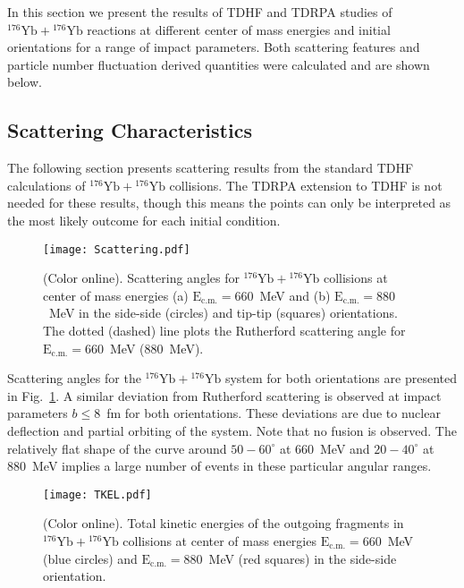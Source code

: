 \documentclass[reprint,aps,prc,twocolumn,superscriptaddress,floatfix,10pt]{revtex4-2}
\begin{document}
In this section we present the results of TDHF and TDRPA studies of $^{176}\mathrm{Yb}+{}^{176}\mathrm{Yb}$ reactions at different center of mass energies and initial orientations  for a range of impact parameters.
Both scattering features and particle number fluctuation derived quantities were calculated and are shown below.


\subsection{Scattering Characteristics}\label{sec:scat}

The following section presents scattering results from the standard TDHF calculations of $^{176}\mathrm{Yb}+{}^{176}\mathrm{Yb}$ collisions.
The TDRPA extension to TDHF is not needed for these results, though this means the points can only be interpreted as the most likely outcome for each initial condition.

\begin{figure}[!htb]
	\texttt{[image: Scattering.pdf]}
	\caption{\protect(Color online). Scattering angles for $^{176}\mathrm{Yb}+{}^{176}\mathrm{Yb}$ collisions at center of mass energies (a) $\mathrm{E_{c.m.}}=660$~MeV and (b) $\mathrm{E_{c.m.}}=880$~MeV in the side-side (circles) and tip-tip (squares) orientations. The  dotted (dashed) line plots the Rutherford scattering angle for $\mathrm{E_{c.m.}}=660$~MeV ($880$~MeV).}
	\label{fig:bvstheta}
\end{figure}

Scattering angles for the $^{176}\mathrm{Yb}+{}^{176}\mathrm{Yb}$ system for both orientations are presented in Fig.~\ref{fig:bvstheta}. 
A similar deviation from Rutherford scattering is observed at impact parameters $b\le8$~fm for both orientations. 
These deviations are due to nuclear deflection and partial orbiting of the system.
Note that no fusion is observed.
The relatively flat shape of the curve around $50-60^\circ$ at 660~MeV and $20-40^\circ$ at 880~MeV implies a large number of events in these particular angular ranges.

\begin{figure}[!htb]
	\texttt{[image: TKEL.pdf]}
	\caption{\protect(Color online). Total kinetic energies of the outgoing fragments in $^{176}\mathrm{Yb}+{}^{176}\mathrm{Yb}$ collisions at center of mass energies $\mathrm{E_{c.m.}}=660$~MeV (blue circles) and $\mathrm{E_{c.m.}}=880$~MeV (red squares) in the side-side orientation.}
	\label{fig:tke}
\end{figure}
\end{document}
